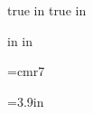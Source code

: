 
%

\sloppy


 true in
 true in
\nopagenumbers

 in
 in
\hsize=8in
\vsize=10.5in
\parindent=0pt

\font\smallfont=cmr7


\def\strutA#1#2{\vrule height#1 depth#2 width0pt}

=3.9in


